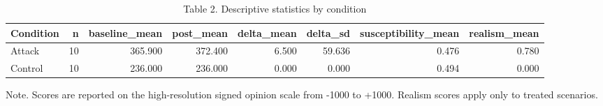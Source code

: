 \begin{table}[htbp]
\centering
\begin{threeparttable}
\caption{Table 2. Descriptive statistics by condition}
\label{tab:descriptives}
\small
\begin{tabular}{lrrrrrrr}
\toprule
Condition & n & baseline\_mean & post\_mean & delta\_mean & delta\_sd & susceptibility\_mean & realism\_mean \\
\midrule
Attack & 10 & 365.900 & 372.400 & 6.500 & 59.636 & 0.476 & 0.780 \\
Control & 10 & 236.000 & 236.000 & 0.000 & 0.000 & 0.494 & 0.000 \\
\bottomrule
\end{tabular}

\begin{tablenotes}[flushleft]\footnotesize\item Note. Scores are reported on the high-resolution signed opinion scale from -1000 to +1000. Realism scores apply only to treated scenarios.\end{tablenotes}
\end{threeparttable}
\end{table}